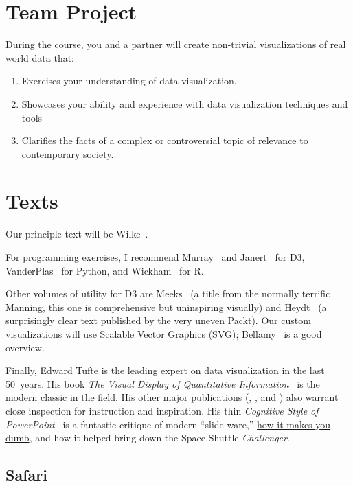 \documentclass[11pt]{article}
\begin{document}
\section{Team Project}

During the course,
you and a partner
will create non-trivial visualizations
of real world data that:
\begin{enumerate}
\item Exercises your understanding of data visualization.
\item Showcases your ability and experience with data visualization techniques and tools
\item Clarifies the facts of a complex or controversial topic of relevance to
  contemporary society.
\end{enumerate}

\section{Texts}

Our principle text will be Wilke~\cite{wilke2019fundamentals}.

For programming exercises,
I recommend Murray~\cite{murray2017interactive} and
Janert~\cite{janert2019d3} for D3,
VanderPlas~\cite{vanderplas2016python} for Python,
and Wickham~\cite{wickham2016r} for R.

Other volumes of utility for D3 are 
Meeks~\cite{meeks2017d3}
(a title from the normally terrific Manning, this one is comprehensive but uninspiring visually)
and Heydt~\cite{heydt2015d3}
(a surprisingly clear text published by the very uneven Packt).
Our custom visualizations will use Scalable Vector Graphics (SVG);
Bellamy~\cite{bellamy2014svg} is a good overview.

Finally,
Edward Tufte is the leading expert on data visualization in the last 50~years.
His book
\emph{The Visual Display of Quantitative Information}~\cite{tufte1983visual}
is the modern classic in the field.
His other major publications
(\cite{tufte1990envisioning},
\cite{tufte1997visual}, and
\cite{tufte2006beautiful})
also warrant close inspection for instruction and inspiration.
His thin \emph{Cognitive Style of PowerPoint}~\cite{tufte2006cognitive}
is a fantastic critique of modern ``slide ware,''
\href{https://www.nytimes.com/2003/12/14/magazine/2003-the-3rd-annual-year-in-ideas-powerpoint-makes-you-dumb.html}{how it makes you dumb},
and how it helped bring down the Space Shuttle \emph{Challenger}.

\subsection{Safari}

\end{document}
